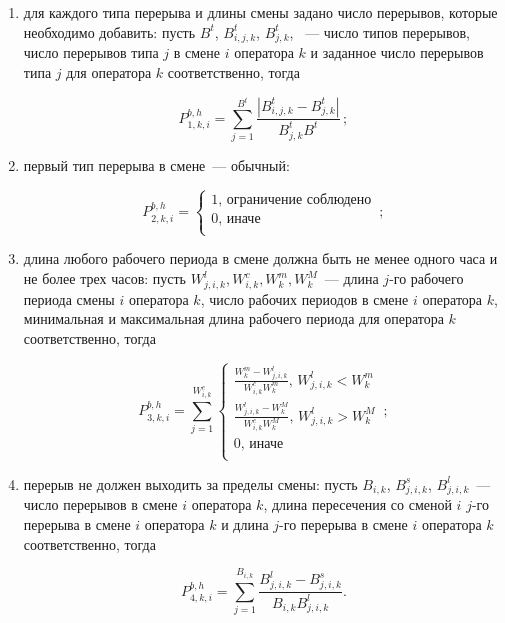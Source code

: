 \documentclass[times,specification,annotation]{itmo-student-thesis}
\begin{document}
\begin{enumerate}
    \item для каждого типа перерыва и длины смены задано число перерывов, которые необходимо добавить: пусть $B^t$, $B^t_{i, j, k}$, $B^t_{j, k}$, ~--- число типов перерывов, число перерывов типа $j$ в смене $i$ оператора $k$ и заданное число перерывов типа $j$ для оператора $k$ соответственно, тогда
    
    \begin{equation} P^{b, h}_{1, k, i} = \sum\limits_{j = 1}^{B^t} \frac{\left| B^t_{i, j, k} - B^t_{j, k} \right|}{B^t_{j, k} B^t}\,; \end{equation}

    \item первый тип перерыва в смене~--- обычный:
    
    \begin{equation} P^{b, h}_{2, k, i} = \begin{cases} 1,\, \text{ограничение соблюдено} \\ 0,\, \text{иначе} \\ \end{cases}\,;  \end{equation}
    
    \item длина любого рабочего периода в смене должна быть не менее одного часа и не более трех часов: пусть $W^l_{j, i, k}, W^c_{i, k}, W^{m}_k, W^{M}_k$~--- длина $j$-го рабочего периода смены $i$ оператора $k$, число рабочих периодов в смене $i$ оператора $k$, минимальная и максимальная длина рабочего периода для оператора $k$ соответственно, тогда
    
    \begin{equation} P^{b, h}_{3, k, i} = \sum\limits_{j = 1}^{W^c_{i, k}} \begin{cases} \frac{W^{m}_k - W^l_{j, i, k}}{W^c_{i, k} W^{m}_k},\, W^l_{j, i, k} < W^{m}_k \\ \frac{W^l_{j, i, k} - W^{M}_k}{W^c_{i, k} W^{M}_k},\, W^l_{j, i, k} > W^{M}_k \\ 0,\, \text{иначе} \\ \end{cases}\,; \end{equation}

    \item перерыв не должен выходить за пределы смены: пусть $B_{i, k}$, $B^s_{j, i, k}$, $B^l_{j, i, k}$~--- число перерывов в смене $i$ оператора $k$, длина пересечения со сменой $i$ $j$-го перерыва в смене $i$ оператора $k$ и длина $j$-го перерыва в смене $i$ оператора $k$ соответственно, тогда

    \begin{equation} P^{b, h}_{4, k, i} = \sum\limits_{j = 1}^{B_{i, k}} \frac{B^l_{j, i, k} - B^s_{j, i, k}}{B_{i, k} B^l_{j, i, k}}. \end{equation}

\end{enumerate}
\end{document}
